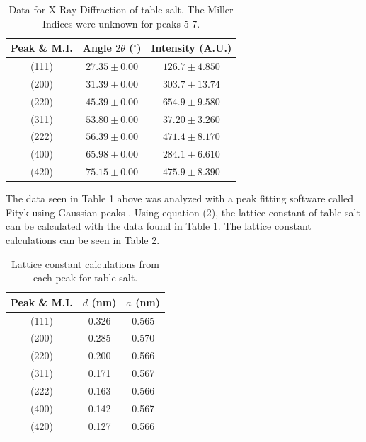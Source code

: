 \documentclass[twocolumn]{article}
\begin{document}
\begin{table}[htp]
\begin{center}
\begin{tabular}{|c|c|c|}
	\hline \small{\textbf{Peak \& M.I.}} & \small{\textbf{Angle $2\theta$ ($^{\circ}$)}} & \small{\textbf{Intensity (A.U.)}} \\ \hline
    (111)& $27.35\pm0.00$ & $126.7\pm4.850$ \\ \hline
    (200)& $31.39\pm0.00$ & $303.7\pm13.74$ \\ \hline
    (220)& $45.39\pm0.00$ & $654.9\pm9.580$ \\ \hline
    (311)& $53.80\pm0.00$ & $37.20\pm3.260$ \\ \hline
    (222)& $56.39\pm0.00$ & $471.4\pm8.170$ \\ \hline
    (400)& $65.98\pm0.00$ & $284.1\pm6.610$ \\ \hline
    (420)& $75.15\pm0.00$ & $475.9\pm8.390$ \\ \hline 
\end{tabular}
\caption{Data for X-Ray Diffraction of table salt. The Miller Indices were unknown for peaks 5-7.}
\end{center}
\label{default}
\end{table}%
\newline
The data seen in Table 1 above was analyzed with a peak fitting software called Fityk using Gaussian peaks \cite{Fityk}. Using equation (2), the lattice constant of table salt can be calculated with the data found in Table 1. The lattice constant calculations can be seen in Table 2.
\begin{table}[htp]
\begin{center}
\begin{tabular}{|c|c|c|}
	\hline \small{\textbf{Peak \& M.I.}} &\small{\textbf{$d$ (nm)}} & \small{\textbf{$a$ (nm)}} \\ \hline
	(111) & 0.326 & 0.565 \\ \hline
	(200) & 0.285 & 0.570 \\ \hline
	(220) & 0.200 & 0.566 \\ \hline
	(311) & 0.171 & 0.567 \\ \hline
	(222) & 0.163 & 0.566 \\ \hline
	(400) & 0.142 & 0.567 \\ \hline
	(420) & 0.127 & 0.566 \\ \hline
\end{tabular}
\caption{Lattice constant calculations from each peak for table salt.}
\end{center}
\label{default}
\end{table}%
\end{document}
